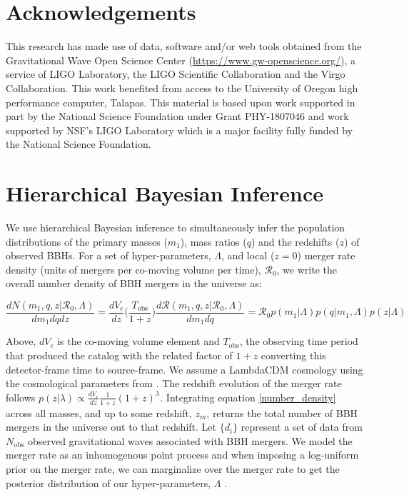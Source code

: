 \documentclass[twocolumn, linenumber]{aastex63}
\begin{document}
\section{Acknowledgements}\label{sec:acknowledments}
This research has made use of data, software and/or web tools obtained from the Gravitational Wave Open Science Center (\url{https://www.gw-openscience.org/}), a service of LIGO Laboratory, the LIGO Scientific Collaboration and the Virgo Collaboration. This work benefited from access to the University of Oregon high performance computer, Talapas.  This material is based upon work supported in part by the National Science Foundation under Grant PHY-1807046 and work supported by NSF’s LIGO Laboratory which is a major facility fully funded by the National Science Foundation.
{}


\appendix
\section{Hierarchical Bayesian Inference} \label{sec:hierarchical_inference}

We use hierarchical Bayesian inference to simultaneously infer the population distributions of the primary masses ($m_1$), mass ratios ($q$) and the redshifts ($z$) of observed BBHs. For a set of hyper-parameters, $\Lambda$, and local ($z=0$) merger rate density (units of mergers per co-moving volume per time), $\mathcal{R}_0$, we write the overall number density of BBH mergers in the universe as: 

\begin{equation} \label{number_density}
     \frac{dN(m_1, q, z | \mathcal{R}_0, \Lambda)}{dm_1dqdz} = \frac{dV_c}{dz}\bigg(\frac{T_\mathrm{obs}}{1+z}\bigg) \frac{d\mathcal{R}(m_1, q, z | \mathcal{R}_0, \Lambda)}{dm_1dq} = \mathcal{R}_0 p(m_1 | \Lambda) p(q | m_1, \Lambda) p(z | \Lambda)
\end{equation}

\noindent
Above, $dV_c$ is the co-moving volume element \citep{hogg_cosmo} and $T_\mathrm{obs}$, the observing time period that produced the catalog with the related factor of $1+z$ converting this detector-frame time to source-frame. We assume a LambdaCDM cosmology using the cosmological parameters from \citet{Planck2015}. The redshift evolution of the merger rate follows $p(z|\lambda) \propto \frac{dV_c}{dz}\frac{1}{1+z}(1+z)^\lambda$. Integrating equation \ref{number_density} across all masses, and up to some redshift, $z_m$, returns the total number of BBH mergers in the universe out to that redshift. Let $\{d_i\}$ represent a set of data from $N_\mathrm{obs}$ observed gravitational waves associated with BBH mergers. We model the merger rate as an inhomogenous point process and when imposing a log-uniform prior on the merger rate, we can marginalize over the merger rate to get the posterior distribution of our hyper-parameters, $\Lambda$ \citep{Mandel_2019, Vitale_2021}.
\end{document}

